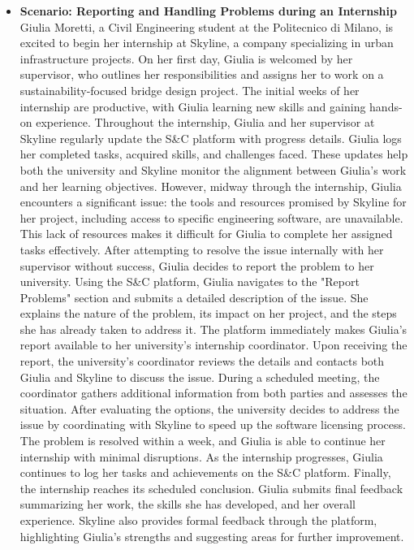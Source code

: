 \begin{itemize}
    \item \textbf{\nth{\thescenario} Scenario: Reporting and Handling Problems during an Internship}
    \\
        Giulia Moretti, a Civil Engineering student at the Politecnico di Milano, is excited to begin her internship at Skyline, a company specializing in urban infrastructure projects. On her first day, Giulia is welcomed by her supervisor, who outlines her responsibilities and assigns her to work on a sustainability-focused bridge design project. The initial weeks of her internship are productive, with Giulia learning new skills and gaining hands-on experience.
        Throughout the internship, Giulia and her supervisor at Skyline regularly update the S\&C platform with progress details. Giulia logs her completed tasks, acquired skills, and challenges faced. These updates help both the university and Skyline monitor the alignment between Giulia’s work and her learning objectives.
        However, midway through the internship, Giulia encounters a significant issue: the tools and resources promised by Skyline for her project, including access to specific engineering software, are unavailable. This lack of resources makes it difficult for Giulia to complete her assigned tasks effectively. After attempting to resolve the issue internally with her supervisor without success, Giulia decides to report the problem to her university.
        Using the S\&C platform, Giulia navigates to the "Report Problems" section and submits a detailed description of the issue. She explains the nature of the problem, its impact on her project, and the steps she has already taken to address it. The platform immediately makes Giulia's report available to her university’s internship coordinator.
        Upon receiving the report, the university’s coordinator reviews the details and contacts both Giulia and Skyline to discuss the issue. During a scheduled meeting, the coordinator gathers additional information from both parties and assesses the situation. After evaluating the options, the university decides to address the issue by coordinating with Skyline to speed up the software licensing process. The problem is resolved within a week, and Giulia is able to continue her internship with minimal disruptions.
        As the internship progresses, Giulia continues to log her tasks and achievements on the S\&C platform. Finally, the internship reaches its scheduled conclusion. Giulia submits final feedback summarizing her work, the skills she has developed, and her overall experience. Skyline also provides formal feedback through the platform, highlighting Giulia’s strengths and suggesting areas for further improvement.

\end{itemize}
